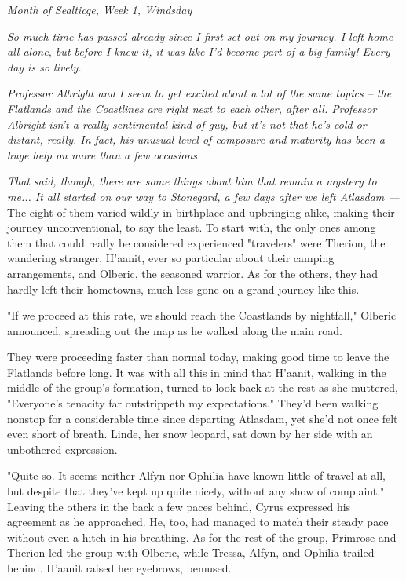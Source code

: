 \begin{flushright}\emph{Month of Sealticge, Week 1, Windsday}\end{flushright}


\emph{So much time has passed already since I first set out on my journey. I left home all alone, but before I knew it, it was like I'd become part of a big family! Every day is so lively.}

\emph{Professor Albright and I seem to get excited about a lot of the same topics -- the Flatlands and the Coastlines are right next to each other, after all. Professor Albright isn't a really sentimental kind of guy, but it's not that he's cold or distant, really. In fact, his unusual level of composure and maturity has been a huge help on more than a few occasions.}

\emph{That said, though, there are some things about him that remain a mystery to me... It all started on our way to Stonegard, a few days after we left Atlasdam ---} 
\\

 The eight of them varied wildly in birthplace and upbringing alike, making their journey unconventional, to say the least. To start with, the only ones among them that could really be considered experienced "travelers" were Therion, the wandering stranger, H'aanit, ever so particular about their camping arrangements, and Olberic, the seasoned warrior. As for the others, they had hardly left their hometowns, much less gone on a grand journey like this. 

"If we proceed at this rate, we should reach the Coastlands by nightfall," Olberic announced, spreading out the map as he walked along the main road.

They were proceeding faster than normal today, making good time to leave the Flatlands before long. It was with all this in mind that H'aanit, walking in the middle of the group's formation, turned to look back at the rest as she muttered, "Everyone's tenacity far outstrippeth my expectations." They'd been walking nonstop for a considerable time since departing Atlasdam, yet she'd not once felt even short of breath. Linde, her snow leopard, sat down by her side with an unbothered expression.

"Quite so. It seems neither Alfyn nor Ophilia have known little of travel at all, but despite that they've kept up quite nicely, without any show of complaint." Leaving the others in the back a few paces behind, Cyrus expressed his agreement as he approached. He, too, had managed to match their steady pace without even a hitch in his breathing. As for the rest of the group, Primrose and Therion led the group with Olberic, while Tressa, Alfyn, and Ophilia trailed behind. H'aanit raised her eyebrows, bemused.

